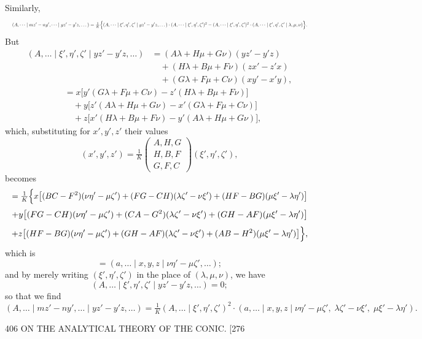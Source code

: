 \documentclass[11pt]{article}
\begin{document}
Similarly,
\[ \resizebox{\textwidth}{!}{$\displaystyle
(A,\dots \mid mz'-ny',\dots \mid yz'-y'z,\dots)
=\tfrac{1}{K}\Bigl\{(A,\dots \mid \xi',\eta',\zeta' \mid yz'-y'z,\dots)\cdot(A,\dots \mid \xi',\eta',\zeta')^{2}
-(A,\dots \mid \xi',\eta',\zeta')^{2}\cdot(A,\dots \mid \xi',\eta',\zeta' \mid \lambda,\mu,\nu)\Bigr\}.$} \]
But
\[ \begin{aligned}
(A,\dots \mid \xi',\eta',\zeta' \mid yz'-y'z,\dots) &= (A\lambda+H\mu+G\nu)(yz'-y'z)\\
&\quad +(H\lambda+B\mu+F\nu)(zx'-z'x)\\
&\quad +(G\lambda+F\mu+C\nu)(xy'-x'y),
\end{aligned} \]
\[ \begin{aligned}
&= x\bigl[y'(G\lambda+F\mu+C\nu)-z'(H\lambda+B\mu+F\nu)\bigr]\\
&\quad +y\bigl[z'(A\lambda+H\mu+G\nu)-x'(G\lambda+F\mu+C\nu)\bigr]\\
&\quad +z\bigl[x'(H\lambda+B\mu+F\nu)-y'(A\lambda+H\mu+G\nu)\bigr],
\end{aligned} \]
which, substituting for $x',y',z'$ their values
\[ (x',y',z')=\tfrac{1}{K}\!\begin{pmatrix}A,H,G\\ H,B,F\\ G,F,C\end{pmatrix}\!(\xi',\eta',\zeta'), \]
becomes
\[ \resizebox{\textwidth}{!}{$\displaystyle
=\tfrac{1}{K}\Bigl\{x\bigl[(BC-F^{2})(\nu\eta'-\mu\zeta')+(FG-CH)(\lambda\zeta'-\nu\xi')+(HF-BG)(\mu\xi'-\lambda\eta')\bigr]$} \]
\[ \resizebox{\textwidth}{!}{$\displaystyle
+y\bigl[(FG-CH)(\nu\eta'-\mu\zeta')+(CA-G^{2})(\lambda\zeta'-\nu\xi')+(GH-AF)(\mu\xi'-\lambda\eta')\bigr]$} \]
\[ \resizebox{\textwidth}{!}{$\displaystyle
+z\bigl[(HF-BG)(\nu\eta'-\mu\zeta')+(GH-AF)(\lambda\zeta'-\nu\xi')+(AB-H^{2})(\mu\xi'-\lambda\eta')\bigr]\Bigr\},$} \]
which is
\[ =(a,\dots \mid x,y,z \mid \nu\eta'-\mu\zeta',\dots); \]
and by merely writing $(\xi',\eta',\zeta')$ in the place of $(\lambda,\mu,\nu)$, we have
\[ (A,\dots \mid \xi',\eta',\zeta' \mid yz'-y'z,\dots)=0; \]
so that we find
\[ (A,\dots \mid mz'-ny',\dots \mid yz'-y'z,\dots)
=\tfrac{1}{K}(A,\dots \mid \xi',\eta',\zeta')^{2}\cdot(a,\dots \mid x,y,z \mid \nu\eta'-\mu\zeta',\;\lambda\zeta'-\nu\xi',\;\mu\xi'-\lambda\eta'). \]

\begin{center}
406 \hfill ON THE ANALYTICAL THEORY OF THE CONIC. \hfill \textsc{[276}
\end{center}
\end{document}
